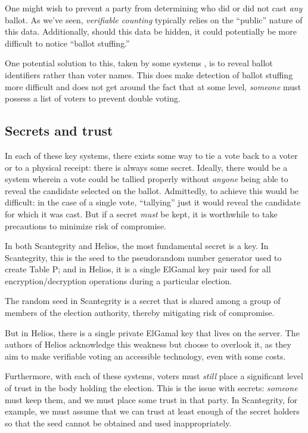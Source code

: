 \documentclass[10pt,twocolumn]{article}
\newcommand{\term}[1]{\textit{#1}}
\begin{document}
One might wish to prevent a party from determining who did or did not cast \emph{any} ballot.
As we've seen, \term{verifiable counting} typically relies on the ``public'' nature of this data.
Additionally, should this data be hidden, it could potentially be more difficult to notice ``ballot
stuffing.''

One potential solution to this, taken by some systems \cite{preta}, is to reveal ballot identifiers
rather than voter names. This does make detection of ballot stuffing more difficult and does not get
around the fact that at some level, \emph{someone} must possess a list of voters to prevent double
voting.

\subsection{Secrets and trust}

In each of these key systems, there exists some way to tie a vote back to a voter or to a physical
receipt: there is always some secret. Ideally, there would be a system wherein a vote could be
tallied properly without \emph{anyone} being able to reveal the candidate selected on the ballot.
Admittedly, to achieve this would be difficult: in the case of a single vote, ``tallying'' just it
would reveal the candidate for which it was cast. But if a secret \emph{must} be kept, it is
worthwhile to take precautions to minimize risk of compromise.

In both Scantegrity and Helios, the most fundamental secret is a key. In Scantegrity, this is the
seed to the pseudorandom number generator used to create Table P; and in Helios, it is a single
ElGamal key pair used for all encryption/decryption operations during a particular election.

The random seed in Scantegrity is a secret that is shared among a group of members of the election
authority, thereby mitigating risk of compromise.

But in Helios, there is a single private ElGamal key that lives on the server. The
authors of Helios acknowledge this weakness but choose to overlook it, as they aim to make
verifiable voting an accessible technology, even with some costs.

Furthermore, with each of these systems, voters must \emph{still} place a significant level of trust
in the body holding the election. This is the issue with secrets: \emph{someone} must keep them, and
we must place some trust in that party. In Scantegrity, for example, we must assume that we can
trust at least enough of the secret holders so that the seed cannot be obtained and used
inappropriately.
\end{document}
